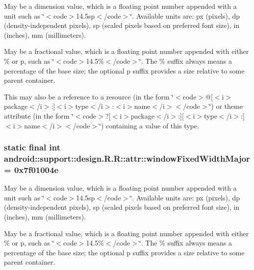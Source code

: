May be a dimension value, which is a floating point number appended with a unit such as \char`\"{}$<$code$>$14.5sp$<$/code$>$\char`\"{}. Available units are: px (pixels), dp (density-independent pixels), sp (scaled pixels based on preferred font size), in (inches), mm (millimeters). 

May be a fractional value, which is a floating point number appended with either \% or p, such as \char`\"{}$<$code$>$14.5\%$<$/code$>$\char`\"{}. The \% suffix always means a percentage of the base size; the optional p suffix provides a size relative to some parent container. 

This may also be a reference to a resource (in the form \char`\"{}$<$code$>$@\mbox{[}$<$i$>$package$<$/i$>$:\mbox{]}$<$i$>$type$<$/i$>$:$<$i$>$name$<$/i$>$$<$/code$>$\char`\"{}) or theme attribute (in the form \char`\"{}$<$code$>$?\mbox{[}$<$i$>$package$<$/i$>$:\mbox{]}\mbox{[}$<$i$>$type$<$/i$>$:\mbox{]}$<$i$>$name$<$/i$>$$<$/code$>$\char`\"{}) containing a value of this type. \hypertarget{classandroid_1_1support_1_1design_1_1_r_1_1attr_831fbd5bf9f607f8185f79b4b512fa0a}{
\subsubsection[{windowFixedWidthMajor}]{\setlength{\rightskip}{0pt plus 5cm}static final int android::support::design.R.R::attr::windowFixedWidthMajor = 0x7f01004e}}
\label{classandroid_1_1support_1_1design_1_1_r_1_1attr_831fbd5bf9f607f8185f79b4b512fa0a}


May be a dimension value, which is a floating point number appended with a unit such as \char`\"{}$<$code$>$14.5sp$<$/code$>$\char`\"{}. Available units are: px (pixels), dp (density-independent pixels), sp (scaled pixels based on preferred font size), in (inches), mm (millimeters). 

May be a fractional value, which is a floating point number appended with either \% or p, such as \char`\"{}$<$code$>$14.5\%$<$/code$>$\char`\"{}. The \% suffix always means a percentage of the base size; the optional p suffix provides a size relative to some parent container. 

